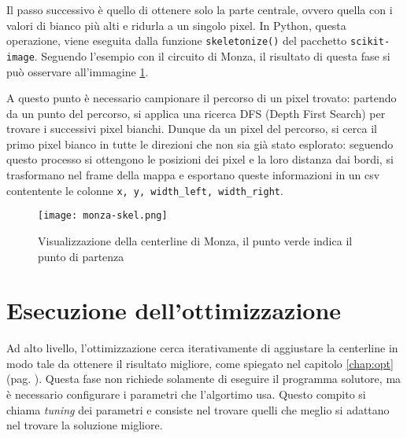 Il passo successivo è quello di ottenere solo la parte centrale, ovvero quella con i valori di bianco
più alti e ridurla a un singolo pixel. In Python, questa operazione, viene eseguita dalla funzione
\verb|skeletonize()| del pacchetto \verb|scikit-image|. Seguendo l'esempio con il circuito di Monza, il
risultato di questa fase si può osservare all'immagine \ref{fig:monza-skel}.

A questo punto è necessario campionare il percorso di un pixel trovato: partendo da un punto del
percorso, si applica una ricerca DFS (Depth First Search) per trovare i successivi pixel bianchi. Dunque
da un pixel del percorso, si cerca il primo pixel bianco in tutte le direzioni che non sia già stato
esplorato: seguendo questo processo si ottengono le posizioni dei pixel e la loro distanza dai bordi, si
trasformano nel frame della mappa e esportano queste informazioni in un csv contentente le colonne
\verb|x, y, width_left, width_right|.
\vfill
\begin{figure}[h]
	\begin{center}
		\texttt{[image: monza-skel.png]}
	\end{center}
	\caption{Visualizzazione della centerline di Monza, il punto verde indica il punto di partenza}\label{fig:monza-skel}
\end{figure}

\newpage

\section{Esecuzione dell'ottimizzazione}
Ad alto livello, l'ottimizzazione cerca iterativamente di aggiustare la centerline in modo tale da
ottenere il risultato migliore, come spiegato nel capitolo \ref{chap:opt} (pag. \pageref{chap:opt}).
Questa fase non richiede solamente di eseguire il programma solutore, ma è necessario
configurare i parametri che l'algortimo usa. Questo compito si chiama \textit{tuning} dei parametri
e consiste nel trovare quelli che meglio si adattano nel trovare la soluzione migliore.


